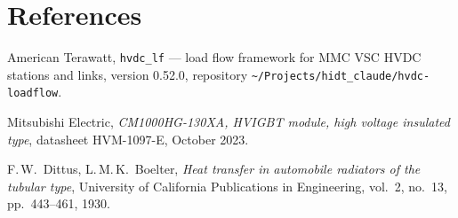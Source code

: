 \section{References}
\label{sec:references}

\begin{enumerate}[label={[\arabic*]}]
  \item American Terawatt, \texttt{hvdc\_lf} --- load flow framework for MMC VSC HVDC stations and links,
        version 0.52.0, repository \texttt{\textasciitilde/Projects/hidt\_claude/hvdc-loadflow}.
  \item Mitsubishi Electric, \emph{CM1000HG-130XA, HVIGBT module, high voltage insulated type}, datasheet
        HVM-1097-E, October 2023.
  \item F.\,W.\ Dittus, L.\,M.\,K.\ Boelter, \emph{Heat transfer in automobile radiators of the tubular type},
        University of California Publications in Engineering, vol.\ 2, no.\ 13, pp.\ 443--461, 1930.
\end{enumerate}
